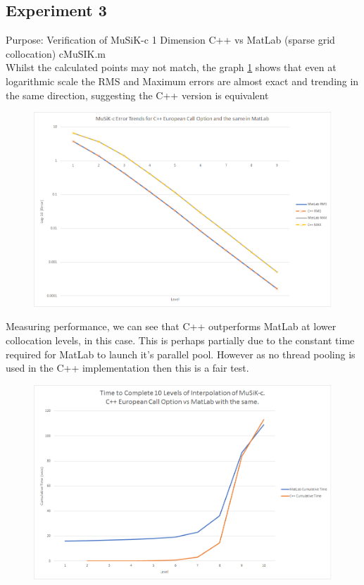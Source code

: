 \documentclass[a4paper]{amsart}
\begin{document}
\subsection{Experiment 3}\label{cppExp3}

Purpose: Verification of MuSiK-c 1 Dimension C++ vs MatLab (sparse grid collocation) cMuSIK.m\\

Whilst the calculated points may not match, the graph \ref{fig:cppExp3e} shows that even at logarithmic scale the RMS and Maximum errors are almost exact and trending in the same direction, suggesting the C++ version is equivalent

\begin{figure}[h]
\centering
\includegraphics[scale=0.3]{cppExp3-errors.png}
\caption {}
\label {fig:cppExp3e}
\end{figure}

Measuring performance, we can see that C++ outperforms MatLab at lower collocation levels, in this case. This is perhaps partially due to the constant time required for MatLab to launch it's parallel pool. However as no thread pooling is used in the C++ implementation then this is a fair test.

\begin{figure}[h]
\centering
\includegraphics[scale=0.3]{cppExp3-time.png}
\caption {}
\label {fig:cppExp3t}
\end{figure}
\end{document}
